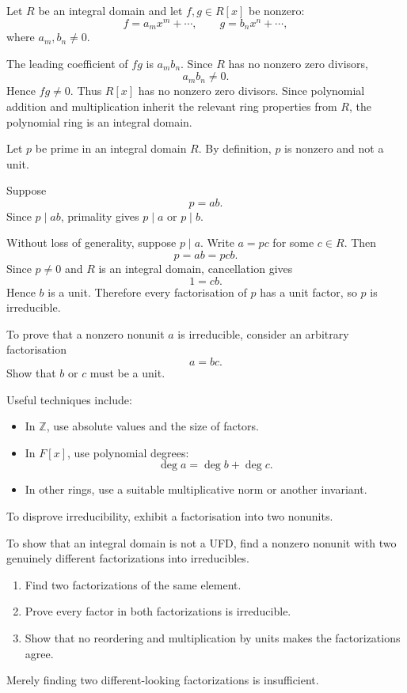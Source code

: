 \begin{method}
  Let $R$ be an integral domain and let $f,g\in R[x]$ be nonzero:
  \[
  f=a_mx^m+\cdots,\qquad
  g=b_nx^n+\cdots,
  \]
  where $a_m,b_n\neq0$.

  The leading coefficient of $fg$ is $a_mb_n$. Since $R$ has no nonzero zero divisors,
  \[
  a_mb_n\neq0.
  \]
  Hence $fg\neq0$. Thus $R[x]$ has no nonzero zero divisors. Since polynomial addition and multiplication inherit the relevant ring properties from $R$, the polynomial ring is an integral domain.
\end{method}

\begin{method}
  Let $p$ be prime in an integral domain $R$. By definition, $p$ is nonzero and not a unit.

  Suppose
  \[
  p=ab.
  \]
  Since $p\mid ab$, primality gives $p\mid a$ or $p\mid b$.

  Without loss of generality, suppose $p\mid a$. Write $a=pc$ for some $c\in R$. Then
  \[
  p=ab=pcb.
  \]
  Since $p\neq0$ and $R$ is an integral domain, cancellation gives
  \[
  1=cb.
  \]
  Hence $b$ is a unit. Therefore every factorisation of $p$ has a unit factor, so $p$ is irreducible.
\end{method}

\begin{method}
  To prove that a nonzero nonunit $a$ is irreducible, consider an arbitrary factorisation
  \[
  a=bc.
  \]
  Show that $b$ or $c$ must be a unit.

  Useful techniques include:
  \begin{itemize}
    \item In $\mathbb{Z}$, use absolute values and the size of factors.
    \item In $F[x]$, use polynomial degrees:
    \[
    \deg a=\deg b+\deg c.
    \]
    \item In other rings, use a suitable multiplicative norm or another invariant.
  \end{itemize}

  To disprove irreducibility, exhibit a factorisation into two nonunits.
\end{method}

\begin{method}
  To show that an integral domain is not a UFD, find a nonzero nonunit with two genuinely different factorizations into irreducibles.

  \begin{enumerate}
    \item Find two factorizations of the same element.
    \item Prove every factor in both factorizations is irreducible.
    \item Show that no reordering and multiplication by units makes the factorizations agree.
  \end{enumerate}

  Merely finding two different-looking factorizations is insufficient.
\end{method}
 
